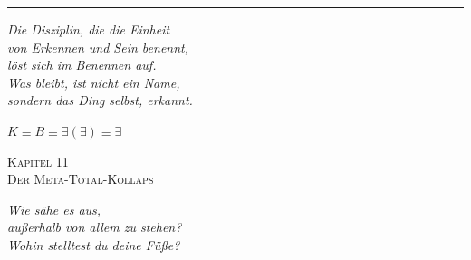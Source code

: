 \documentclass[10pt, openany, oneside]{book}
\renewcommand{\large}{\fontsize{11.5}{14}\selectfont}
\renewcommand{\huge}{\fontsize{17}{21}\selectfont}
\begin{document}
\vspace{2em}

\begin{center}
    \rule{0.15\textwidth}{0.3pt}
\end{center}

\vspace{0.5em}

\begin{center}
    \itshape
    Die Disziplin, die die Einheit\\
    von Erkennen und Sein benennt,\\
    löst sich im Benennen auf.\\[0.8em]
    Was bleibt, ist nicht ein Name,\\
    sondern das Ding selbst, erkannt.
\end{center}

\vspace{0.5em}

\begin{center}
    $K \equiv B \equiv \exists(\exists) \equiv \exists$
\end{center}

%
%
%
%

\newpage

\begin{center}
    {\huge\scshape Kapitel 11}\\[0.3em]
    {\large\scshape Der Meta-Total-Kollaps}
\end{center}

\vspace{1.5em}

\begin{center}
    \itshape
    Wie sähe es aus,\\
    außerhalb von allem zu stehen?\\
    Wohin stelltest du deine Füße?
\end{center}
\end{document}

